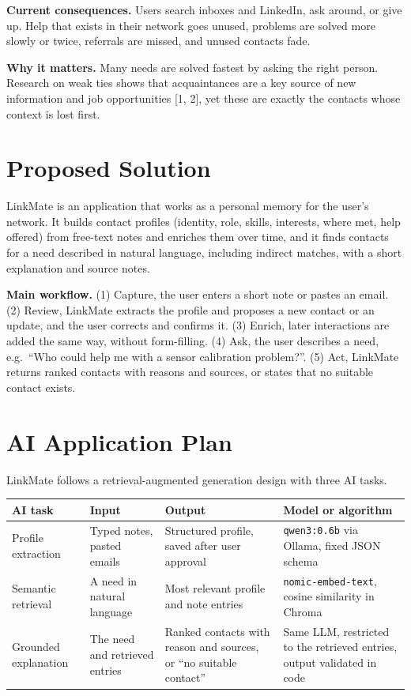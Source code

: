 \documentclass[11pt,letterpaper]{article}
\begin{document}
\textbf{Current consequences.} Users search inboxes and LinkedIn, ask around, or give up. Help that exists in their network goes unused, problems are solved more slowly or twice, referrals are missed, and unused contacts fade.

\textbf{Why it matters.} Many needs are solved fastest by asking the right person. Research on weak ties shows that acquaintances are a key source of new information and job opportunities [1, 2], yet these are exactly the contacts whose context is lost first.

\section{Proposed Solution}
LinkMate is an application that works as a personal memory for the user's network. It builds contact profiles (identity, role, skills, interests, where met, help offered) from free-text notes and enriches them over time, and it finds contacts for a need described in natural language, including indirect matches, with a short explanation and source notes.

\textbf{Main workflow.} (1) Capture, the user enters a short note or pastes an email. (2) Review, LinkMate extracts the profile and proposes a new contact or an update, and the user corrects and confirms it. (3) Enrich, later interactions are added the same way, without form-filling. (4) Ask, the user describes a need, e.g.\ ``Who could help me with a sensor calibration problem?''. (5) Act, LinkMate returns ranked contacts with reasons and sources, or states that no suitable contact exists.

\section{AI Application Plan}
LinkMate follows a retrieval-augmented generation design with three AI tasks.

\begin{center}\small
\begin{tabularx}{\linewidth}{@{}lYYY@{}}
  \toprule
  AI task & Input & Output & Model or algorithm \\
  \midrule
  Profile extraction & Typed notes, pasted emails & Structured profile, saved after user approval & \texttt{qwen3:0.6b} via Ollama, fixed JSON schema \\
  Semantic retrieval & A need in natural language & Most relevant profile and note entries & \texttt{nomic-embed-text}, cosine similarity in Chroma \\
  Grounded explanation & The need and retrieved entries & Ranked contacts with reason and sources, or ``no suitable contact'' & Same LLM, restricted to the retrieved entries, output validated in code \\
  \bottomrule
\end{tabularx}
\end{center}
\end{document}
